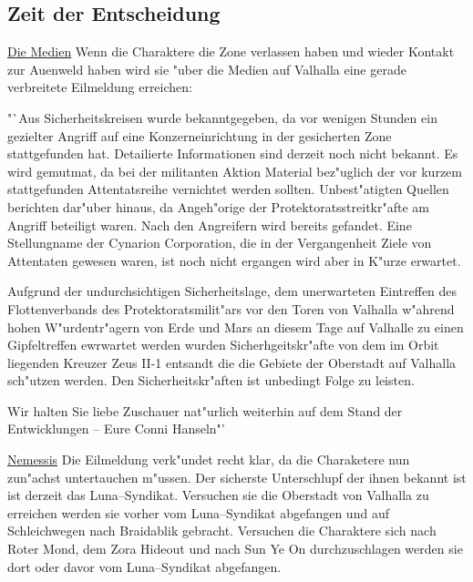 \subsection{Zeit der Entscheidung}

\underline{Die Medien} Wenn die Charaktere die Zone verlassen haben und wieder Kontakt zur Au\3enweld haben wird sie "uber die Medien auf Valhalla eine gerade verbreitete Eilmeldung erreichen:

"`Aus Sicherheitskreisen wurde bekanntgegeben, da\3 vor wenigen Stunden ein gezielter Angriff auf eine Konzerneinrichtung in der 
gesicherten Zone stattgefunden hat. Detailierte Informationen sind derzeit noch nicht bekannt. Es wird gemutma\3t, da\3 bei der 
militanten Aktion Material bez"uglich der vor kurzem stattgefunden Attentatsreihe vernichtet werden sollten. Unbest"atigten Quellen berichten dar"uber hinaus, da\3 Angeh"orige der Protektoratsstreitkr"afte am Angriff beteiligt waren. Nach den Angreifern 
wird bereits gefandet. Eine Stellungname der Cynarion Corporation, die in der Vergangenheit Ziele von Attentaten gewesen
waren, ist noch nicht ergangen wird aber in K"urze erwartet.

Aufgrund der undurchsichtigen Sicherheitslage, dem unerwarteten Eintreffen des Flottenverbands des Protektoratsmilit"ars vor den Toren von Valhalla w"ahrend hohen W"urdentr"agern von Erde und Mars an diesem Tage auf Valhalle zu einen Gipfeltreffen ewrwartet werden wurden Sicherhgeitskr"afte von dem im Orbit liegenden Kreuzer Zeus II-1 entsandt die die Gebiete der Oberstadt auf Valhalla sch"utzen werden. Den Sicherheitskr"aften ist unbedingt Folge zu leisten.

Wir halten Sie liebe Zuschauer nat"urlich weiterhin auf dem Stand der Entwicklungen -- Eure Conni Hanseln"'

\underline{Nemessis} Die Eilmeldung verk"undet recht klar, da\3 die Charaketere nun zun"achst untertauchen m"ussen. Der sicherste Unterschlupf der ihnen bekannt ist ist derzeit das Luna--Syndikat. Versuchen sie die Oberstadt von Valhalla zu erreichen werden sie vorher vom Luna--Syndikat abgefangen und auf Schleichwegen nach Braidablik gebracht. Versuchen die Charaktere sich nach Roter Mond, dem Zora Hideout und nach Sun Ye On durchzuschlagen werden sie dort oder davor vom Luna--Syndikat abgefangen.

